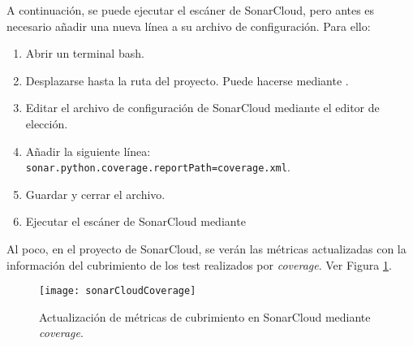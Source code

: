 A continuación, se puede ejecutar el escáner de SonarCloud, pero antes es necesario añadir una nueva línea a su archivo de configuración. Para ello:
\begin{enumerate}
\item Abrir un terminal bash.
\item Desplazarse hasta la ruta del proyecto. Puede hacerse mediante .
\item Editar el archivo de configuración de SonarCloud mediante el editor de elección. 
\item Añadir la siguiente línea:\\ \texttt{sonar.python.coverage.reportPath=coverage.xml}.
\item Guardar y cerrar el archivo.
\item Ejecutar el escáner de SonarCloud mediante\\ 
\end{enumerate}

Al poco, en el proyecto de SonarCloud, se verán las métricas actualizadas con la información del cubrimiento de los test realizados por \emph{coverage}. Ver Figura \ref{fig:sonarCloudCoverage}.

\begin{figure}
	\centering
	\texttt{[image: sonarCloudCoverage]}
	\caption[Métricas de \emph{coverage} en SonarCloud]{Actualización de métricas de cubrimiento en SonarCloud mediante \emph{coverage}.}\label{fig:sonarCloudCoverage}
\end{figure}



